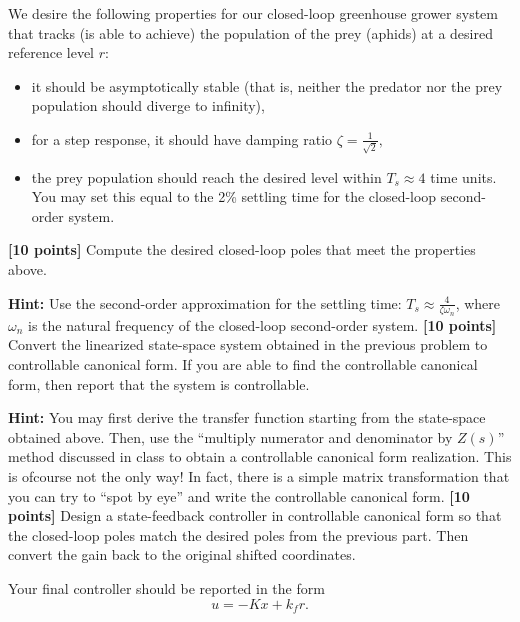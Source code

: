 \documentclass{ee122_pset}
\begin{document}
We desire the following properties for our closed-loop greenhouse grower system that tracks (is able to achieve) the population of the prey (aphids) at a desired reference level \(r\):
\begin{itemize}
    \item it should be asymptotically stable (that is, neither the predator nor the prey population should diverge to infinity),
    \item for a step response, it should have damping ratio
    \(
    \zeta=\frac{1}{\sqrt{2}},
    \)
    \item the prey population should reach the desired level within
    \(
    T_s \approx 4
    \)
    time units. You may set this equal to the 2\% settling time for the closed-loop second-order system.
\end{itemize}

\problempart \textbf{[10 points]} Compute the desired closed-loop poles that meet the properties above. 

\textbf{Hint:} Use the second-order approximation for the settling time: $T_s \approx \frac{4}{\zeta\omega_n}$, where \(\omega_n\) is the natural frequency of the closed-loop second-order system. 
\problempart \textbf{[10 points]} Convert the linearized state-space system obtained in the previous problem to controllable canonical form. If you are able to find the controllable canonical form, then report that the system is controllable. 

\textbf{Hint:} You may first derive the transfer function starting from the state-space obtained above. Then, use the ``multiply numerator and denominator by \(Z(s)\)'' method discussed in class to obtain a controllable canonical form realization. This is ofcourse not the only way! In fact, there is a simple matrix transformation that you can try to ``spot by eye'' and write the controllable canonical form. 
\problempart \textbf{[10 points]} Design a state-feedback controller in controllable canonical form so that the closed-loop poles match the desired poles from the previous part. Then convert the gain back to the original shifted coordinates.

Your final controller should be reported in the form
\[
u=-Kx+k_f r.
\]
\end{document}
